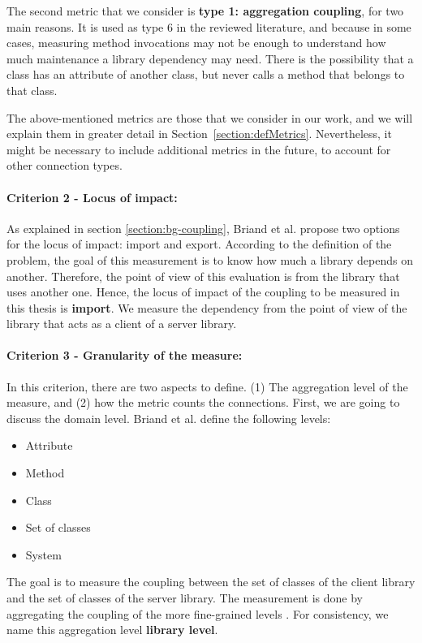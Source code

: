 The second metric that we consider is \textbf{type 1: aggregation coupling}, for two main reasons. It is used as type 6 in the reviewed literature, and because in some cases, measuring method invocations may not be enough to understand how much maintenance a library dependency may need. There is the possibility that a class has an attribute of another class, but never calls a method that belongs to that class.

The above-mentioned metrics are those that we consider in our work, and we will explain them in greater detail in Section~\ref{section:defMetrics}. Nevertheless, it might be necessary to include additional metrics in the future, to account for other connection types.

\paragraph{Criterion 2 - Locus of impact:}
As explained in section \ref{section:bg-coupling}, Briand et al. \cite{briand1999unified} propose two options for the locus of impact: import and export. According to the definition of the problem, the goal of this measurement is to know how much a library depends on another. Therefore, the point of view of this evaluation is from the library that uses another one. Hence, the locus of impact of the coupling to be measured in this thesis is \textbf{import}. We measure the dependency from the point of view of the library that acts as a client of a server library.

\paragraph{Criterion 3 - Granularity of the measure:}
In this criterion, there are two aspects to define. (1) The aggregation level of the measure, and (2) how the metric counts the connections. First, we are going to discuss the domain level. Briand et al. \cite{briand1999unified} define the following levels:

\begin{itemize}[noitemsep]
  \renewcommand\labelitemi{--}
  \item Attribute
  \item Method
  \item Class
  \item Set of classes
  \item System
\end{itemize}

\blankls
The goal is to measure the coupling between the set of classes of the client library and the set of classes of the server library. The measurement is done by aggregating the coupling of the more fine-grained levels \cite{briand1999unified}. For consistency, we name this aggregation level \textbf{library level}.

